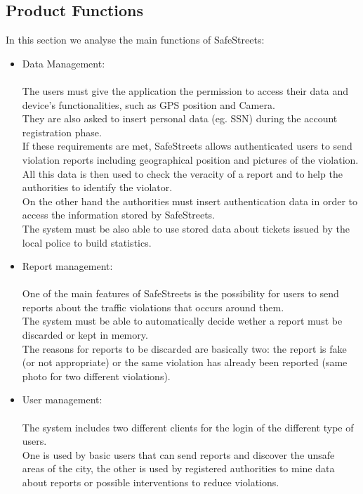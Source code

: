 \subsection{Product Functions}
In this section we analyse the main functions of SafeStreets: 
\begin{itemize}
	\item Data Management: \\ \\
	The users must give the application the permission to access their data and device’s functionalities, such as GPS position and Camera. \\
	They are also asked to insert personal data (eg. SSN) during the account registration phase. \\
	If these requirements are met, SafeStreets allows authenticated users to send violation reports including geographical position and pictures of the violation. \\
	All this data is then used to check the veracity of a report and to help the authorities to identify the violator. \\
	On the other hand the authorities must insert authentication data in order to access the information stored by SafeStreets. \\
	The system must be also able to use stored data about tickets issued by the local police to build statistics.
	
	\item Report management: \\ \\
	One of the main features of SafeStreets is the possibility for users to send reports about the traffic violations that occurs around them. \\
	The system must be able to automatically decide wether a report must be discarded or kept in memory. \\
	The reasons for reports to be discarded are basically two: the report is fake (or not appropriate) or the same violation has already been reported (same photo for two different violations). 
	
	\item User management: \\ \\
	The system includes two different clients for the login of the different type of users. \\
	One is used by basic users that can send reports and discover the unsafe areas of the city, the other is used by registered authorities to mine data about reports or possible interventions to reduce violations. \\
	

\end{itemize}
